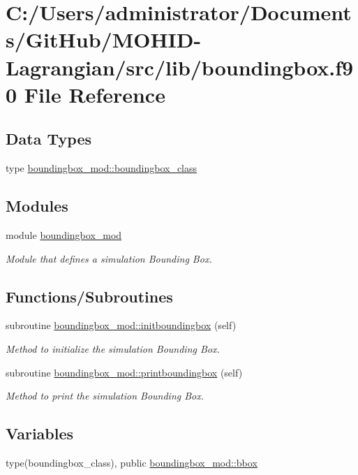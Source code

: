 \hypertarget{boundingbox_8f90}{}\section{C\+:/\+Users/administrator/\+Documents/\+Git\+Hub/\+M\+O\+H\+I\+D-\/\+Lagrangian/src/lib/boundingbox.f90 File Reference}
\label{boundingbox_8f90}
\subsection*{Data Types}
\begin{DoxyCompactItemize}
\item 
type \hyperlink{structboundingbox__mod_1_1boundingbox__class}{boundingbox\+\_\+mod\+::boundingbox\+\_\+class}
\end{DoxyCompactItemize}
\subsection*{Modules}
\begin{DoxyCompactItemize}
\item 
module \hyperlink{namespaceboundingbox__mod}{boundingbox\+\_\+mod}
\begin{DoxyCompactList}\small\item\em Module that defines a simulation Bounding Box. \end{DoxyCompactList}\end{DoxyCompactItemize}
\subsection*{Functions/\+Subroutines}
\begin{DoxyCompactItemize}
\item 
subroutine \hyperlink{namespaceboundingbox__mod_a35e41bb92c19802441dd8d748c3acfb4}{boundingbox\+\_\+mod\+::initboundingbox} (self)
\begin{DoxyCompactList}\small\item\em Method to initialize the simulation Bounding Box. \end{DoxyCompactList}\item 
subroutine \hyperlink{namespaceboundingbox__mod_a6ec461b758bc180dc72b5fb23169feca}{boundingbox\+\_\+mod\+::printboundingbox} (self)
\begin{DoxyCompactList}\small\item\em Method to print the simulation Bounding Box. \end{DoxyCompactList}\end{DoxyCompactItemize}
\subsection*{Variables}
\begin{DoxyCompactItemize}
\item 
type(boundingbox\+\_\+class), public \hyperlink{namespaceboundingbox__mod_a45e98e492bb546328c98f618a74622ec}{boundingbox\+\_\+mod\+::bbox}
\end{DoxyCompactItemize}

